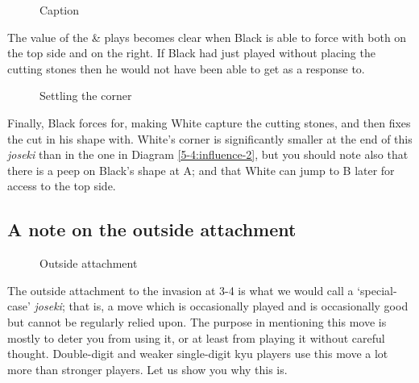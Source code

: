 \documentclass[a5paper,12pt,twoside]{book} %
\newcounter{joseki}                 %
\newcommand{\dref}[1]{Diagram \ref{#1}}
\newcommand{\addstufftotoc}[2][toc]{%
  \addtocontents{#1}{#2}}
\begin{document}
\begin{figure}[!htbp]
 
\vspace{-0.6cm}\caption{Caption}
\label{5-4:influence-5}
\end{figure}

The value of the{\large\blackstone[6]} \&{\large\blackstone[8]} plays becomes clear when Black is able to force with both{\large\blackstone[10]} on the top side and{\large\blackstone[12]} on the right. If Black had just played{\large\blackstone[10]} without placing the cutting stones then he would not have been able to get{\large\whitestone[13]} as a response to{\large\blackstone[12]}.\\

\begin{figure}[!htbp]
 
\vspace{-0.6cm}\caption{Settling the corner}
\label{5-4:influence-6}
\end{figure}

\addstufftotoc{\nobreak\smallskip\protect\par}

Finally, Black forces{\large\blackstone[14]} for{\large\whitestone[15]}, making White capture the cutting stones, and then fixes the cut in his shape with{\large\blackstone[16]}. White’s corner is significantly smaller at the end of this \textit{joseki} than in the one in \dref{5-4:influence-2}, but you should note also that there is a peep on Black's shape at A; and that White can jump to B later for access to the top side.\\

\subsection*{A note on the outside attachment}

\begin{figure}[!htbp]
 
\vspace{-0.6cm}\caption{Outside attachment}
\label{5-4:outside-1}
\end{figure}

The outside attachment to the invasion at 3-4 is what we would call a `special-case' \textit{joseki}; that is, a move which is occasionally played and is occasionally good but cannot be regularly relied upon. The purpose in mentioning this move is mostly to deter you from using it, or at least from playing it without careful thought. Double-digit and weaker single-digit kyu players use this move a lot more than stronger players. Let us show you why this is.\\
\end{document}
